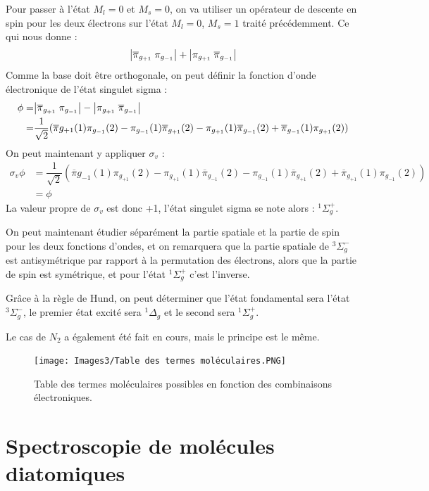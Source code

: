 Pour passer à l'état $M_l = 0$ et $M_s = 0$, on va utiliser un opérateur de descente en spin pour les deux électrons sur l'état $M_l = 0$, $M_s = 1$ traité précédemment. Ce qui nous donne :
\[
\abs{\overline{\pi}_{g_{+1}}\;\pi_{g_{-1}}} + \abs{\pi_{g_{+1}}\;\overline{\pi}_{g_{-1}}}
\]
Comme la base doit être orthogonale, on peut définir la fonction d'onde électronique de l'état singulet sigma :
\begin{align*}
    \phi =& \abs{\overline{\pi}_{g_{+1}}\;\pi_{g_{-1}}} - \abs{\pi_{g_{+1}}\;\overline{\pi}_{g_{-1}}}\\
    =& \dfrac{1}{\sqrt{2}}(\overline{\pi}{g_{+1}}(1)\pi_{g_{-1}}(2) - \pi_{g_{-1}}(1)\overline{\pi}_{g_{+1}}(2) - \pi_{g_{+1}}(1)\overline{\pi}_{g_{-1}}(2) + \overline{\pi}_{g_{-1}}(1)\pi_{g_{+1}}(2))
\end{align*}
On peut maintenant y appliquer $\sigma_v$ :
\begin{align*}
    \sigma_v\phi &= \dfrac{1}{\sqrt{2}}(\overline{\pi}{g_{-1}}(1)\pi_{g_{+1}}(2) - \pi_{g_{+1}}(1)\overline{\pi}_{g_{-1}}(2) - \pi_{g_{-1}}(1)\overline{\pi}_{g_{+1}}(2) + \overline{\pi}_{g_{+1}}(1)\pi_{g_{-1}}(2))\\
    &= \phi
\end{align*}
La valeur propre de $\sigma_v$ est donc +1, l'état singulet sigma se note alors : $^1\Sigma_g^+$.


On peut maintenant étudier séparément la partie spatiale et la partie de spin pour les deux fonctions d'ondes, et on remarquera que la partie spatiale de $^3\Sigma_g^-$ est antisymétrique par rapport à la permutation des électrons, alors que la partie de spin est symétrique, et pour l'état $^1\Sigma^+_g$ c'est l'inverse.


Grâce à la règle de Hund, on peut déterminer que l'état fondamental sera l'état $^3\Sigma_g^-$, le premier état excité sera $^1\Delta_g$ et le second sera $^1\Sigma^+_g$.


Le cas de $N_2$ a également été fait en cours, mais le principe est le même.
\begin{figure}
\centering
\texttt{[image: Images3/Table des termes moléculaires.PNG]}
\caption{Table des termes moléculaires possibles en fonction des combinaisons électroniques.}
\label{fig:termes_mol}
\end{figure}


\section{Spectroscopie de molécules diatomiques}


